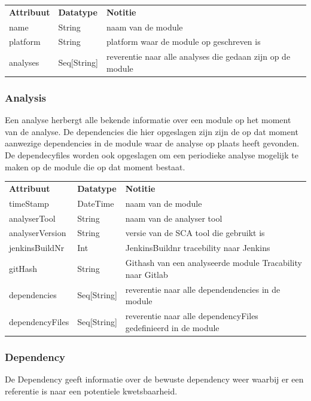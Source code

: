 \begin{tabular}{lll}
    \textbf{Attribuut} & \textbf{Datatype} & \textbf{Notitie}\\
    name  & String & naam van de module\\
    platform  & String & platform waar de module op geschreven is \\
    analyses  & Seq[String] & reverentie naar alle analyses die gedaan zijn op de module\\
\end{tabular}

\subsubsection{Analysis}\label{subsubsec:analysis}
Een analyse herbergt alle bekende informatie over een module op het moment van de analyse. De dependencies die hier opgeslagen zijn zijn de op dat moment aanwezige dependencies in de module waar de analyse op plaats heeft gevonden. De dependecyfiles worden ook opgeslagen om een periodieke analyse mogelijk te maken op de module die op dat moment bestaat.

\begin{tabular}{lll}
    \textbf{Attribuut} & \textbf{Datatype} & \textbf{Notitie}\\
    timeStamp & DateTime & naam van de module\\
    analyserTool & String & naam van de analyser tool\\
    analyserVersion & String & versie van de SCA tool die gebruikt is\\
    jenkinsBuildNr & Int & JenkinsBuildnr tracebility naar Jenkins\\
    gitHash & String & Githash van een analyseerde module Tracability naar Gitlab\\
    dependencies & Seq[String] & reverentie naar alle dependendencies in de module\\
    dependencyFiles & Seq[String] & reverentie naar alle dependencyFiles gedefinieerd in de module\\
\end{tabular}


\subsubsection{Dependency}\label{subsubsec:dependency}
De Dependency geeft informatie over de bewuste dependency weer waarbij er een referentie is naar een potentiele kwetsbaarheid.

